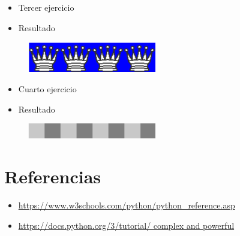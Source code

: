 \documentclass{article}
\begin{document}
	\begin{itemize}
		\item Tercer ejercicio
	\end{itemize}
	
	\begin{itemize}
		\item Resultado
	\end{itemize}
	\begin{figure}[H]
		\centering
		\includegraphics[width=0.5\textwidth,keepaspectratio]{img/Ejercicio2c.png}
	\end{figure}
	\begin{itemize}
		\item Cuarto ejercicio
	\end{itemize}
	
	\begin{itemize}
		\item Resultado
	\end{itemize}
	\begin{figure}[H]
		\centering
		\includegraphics[width=0.5\textwidth,keepaspectratio]{img/Ejercicio2d.png}
	\end{figure}
\section{Referencias}
\begin{itemize}			
	\item \url{https://www.w3schools.com/python/python_reference.asp}
	\item\url{https://docs.python.org/3/tutorial/ complex and powerful}
\end{itemize}	
	
%
%
%
			
\end{document}
